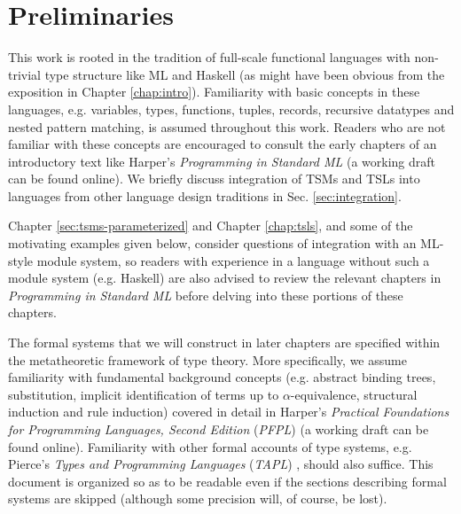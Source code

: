 
\section{Preliminaries}
This work is rooted in the tradition of full-scale functional languages with non-trivial type structure like ML and Haskell (as might have been obvious from the exposition in Chapter \ref{chap:intro}). Familiarity with basic concepts in these languages, e.g. variables, types, functions, tuples, records,  recursive datatypes and nested pattern matching, is assumed throughout this work. Readers who are not familiar with these concepts are encouraged to consult the early chapters of an introductory text like Harper's \emph{Programming in Standard ML} \cite{harper1997programming} (a working draft can be found online). We briefly discuss integration of TSMs and TSLs into languages from other language design traditions in Sec. \ref{sec:integration}.

Chapter \ref{sec:tsms-parameterized} and Chapter \ref{chap:tsls}, and some of the motivating examples given below, consider questions of integration with an ML-style module system, so readers with experience in a language without such a module system (e.g. Haskell) are also advised to review the relevant chapters in \emph{Programming in Standard ML} \cite{harper1997programming} before delving into these portions of these chapters.

The formal systems that we will construct in later chapters are specified within the metatheoretic framework of type theory. More specifically, we assume familiarity with fundamental background concepts (e.g. abstract binding trees, substitution, implicit identification of terms up to $\alpha$-equivalence, structural induction and rule induction) covered in detail in Harper's \emph{Practical Foundations for Programming Languages, Second Edition} (\emph{PFPL}) \cite{pfpl} (a working draft can be found online). Familiarity with other formal accounts of type systems, e.g. Pierce's \emph{Types and Programming Languages} (\emph{TAPL}) \cite{tapl}, should also suffice. This document is organized so as to be readable even if the sections describing formal systems are skipped (although some precision will, of course, be lost).

